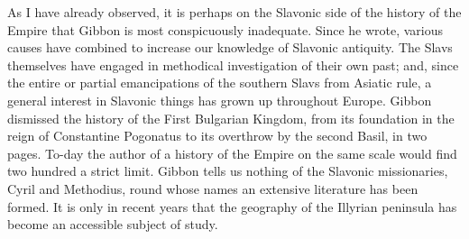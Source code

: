 As I have already observed, it is perhaps on the Slavonic side of the history of the Empire that Gibbon is most conspicuously inadequate. Since he wrote, various causes have combined to increase our knowledge of Slavonic antiquity. The Slavs themselves have engaged in methodical investigation of their own past; and, since the entire or partial emancipations of the southern Slavs from Asiatic rule, a general interest in Slavonic things has grown up throughout Europe. Gibbon dismissed the history of the First Bulgarian Kingdom, from its foundation in the reign of Constantine Pogonatus to its overthrow by the second Basil, in two pages. To-day the author of a history of the Empire on the same scale would find two hundred a strict limit. Gibbon tells us nothing of the Slavonic missionaries, Cyril and Methodius, round whose names an extensive literature has been formed. It is only in recent years that the geography of the Illyrian peninsula has become an accessible subject of study.

